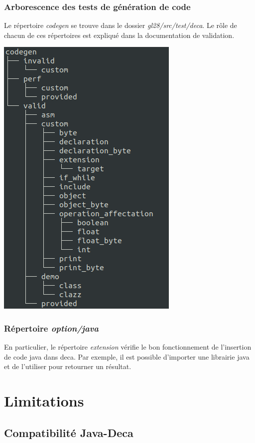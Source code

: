 \documentclass[12pt, a4paper, one side]{article}
\begin{document}
    \subsubsection{Arborescence des tests de génération de code}
    Le répertoire \textit{codegen} se trouve dans le dossier \textit{gl28/src/test/deca}. Le rôle de chacun de ces répertoires est expliqué dans la documentation de validation.
    \begin{center}
        \includegraphics[scale=0.6]{treecodegen.png}
    \end{center}

    \subsubsection{Répertoire \textit{option/java}}
    En particulier, le répertoire \textit{extension} vérifie le bon fonctionnement de l'insertion de code java dans deca. Par exemple, il est possible d'importer une librairie java et de l'utiliser pour retourner un résultat.


    \section{Limitations}
    \subsection{Compatibilité Java-Deca}

    \newpage
    \printbibliography
\end{document}
